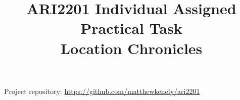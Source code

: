 \documentclass[a4paper, oneside, 11pt]{article}
\title{\textbf{ARI2201 Individual Assigned Practical Task} \\ Location Chronicles}
\begin{document}
\maketitle

\setlength{\columnsep}{1cm}


\begin{center}
Project repository: \href{https://github.com/matthewkenely/ari2201}{\url{https://github.com/matthewkenely/ari2201}}
\end{center}

\medskip
\end{document}
